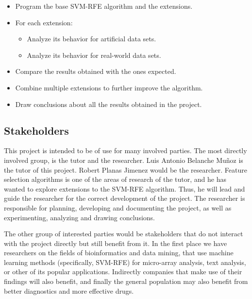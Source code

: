 \begin{itemize}
    \item Program the base SVM-RFE algorithm and the extensions.
    \item {
        For each extension:
        \begin{itemize}
            \item Analyze its behavior for artificial data sets.
            \item Analyze its behavior for real-world data sets.
        \end{itemize}
    }
    \item Compare the results obtained with the ones expected.
    \item Combine multiple extensions to further improve the algorithm.
    \item Draw conclusions about all the results obtained in the project.
\end{itemize}


\subsection{Stakeholders}

This project is intended to be of use for many involved parties. The most directly involved group, is the tutor and the researcher. Luis Antonio Belanche Muñoz is the tutor of this project. Robert Planas Jimenez would be the researcher. Feature selection algorithms is one of the areas of research of the tutor, and he has wanted to explore extensions to the SVM-RFE algorithm. Thus, he will lead and guide the researcher for the correct development of the project. The researcher is responsible for planning, developing and documenting the project, as well as experimenting, analyzing and drawing conclusions.

The other group of interested parties would be stakeholders that do not interact with the project directly but still benefit from it. In the first place we have researchers on the fields of bioinformatics and data mining, that use machine learning methods (specifically, SVM-RFE) for micro-array analysis, text analysis, or other of its popular applications. Indirectly companies that make use of their findings will also benefit, and finally the general population may also benefit from better diagnostics and more effective drugs. 

\label{sec:risk}
